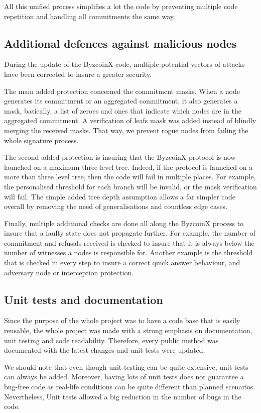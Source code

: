 \documentclass[11pt, a4paper, twoside, openright]{article}
\begin{document}
All this unified process simplifies a lot the code by preventing multiple code repetition and handling all commitments the same way.

\subsection{Additional defences against malicious nodes}
During the update of the ByzcoinX code, multiple potential vectors of attacks have been corrected to insure a greater security.

The main added protection concerned the commitment masks. When a node generates its commitment or an aggregated commitment, it also generates a mask, basically, a list of zeroes and ones that indicate which nodes are in the aggregated commitment. A verification of leafs mask was added instead of blindly merging the received masks. That way, we prevent rogue nodes from failing the whole signature process.

The second added protection is insuring that the ByzcoinX protocol is now launched on a maximum three level tree. Indeed, if the protocol is launched on a more than three level tree, then the code will fail in multiple places. For example, the personalised threshold for each branch will be invalid, or the mask verification will fail. The simple added tree depth assumption allows a far simpler code overall by removing the need of generalisations and countless edge cases.

Finally, multiple additional checks are done all along the ByzcoinX process to insure that a faulty state does not propagate further. For example, the number of commitment and refusals received is checked to insure that it is always below the number of witnesses a nodes is responsible for. Another example is the threshold that is checked in every step to insure a correct quick answer behaviour, and adversary node or interception protection.

\subsection{Unit tests and documentation}
Since the purpose of the whole project was to have a code base that is easily reusable, the whole project was made with a strong emphasis on documentation, unit testing and code readability. Therefore, every public method was documented with the latest changes and unit tests were updated.

We should note that even though unit testing can be quite extensive, unit tests can always be added. Moreover, having lots of unit tests does not guarantee a bug-free code as real-life conditions can be quite different than planned scenarios. Nevertheless, Unit tests allowed a big reduction in the number of bugs in the code.
\end{document}
